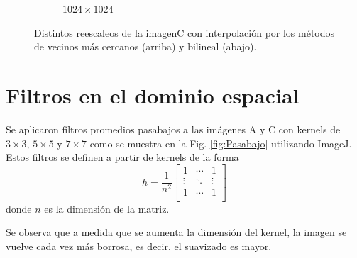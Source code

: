\documentclass[11pt,twocolumn,twoside]{opticajnl}
\begin{document}
\begin{figure}[h]
\begin{subfigure}[h]{0.24\linewidth}
            \caption{$1024\times1024$} 
         \end{subfigure}
    \caption{Distintos reescaleos de la imagenC con interpolación por los métodos de vecinos más cercanos (arriba) y bilineal (abajo).}
    \label{fig:Interpolate}
\end{figure}

\section{Filtros en el dominio espacial\label{sec:ej4}}

\vspace{0.3cm}

Se aplicaron filtros promedios pasabajos a las imágenes A y C con kernels de $3\times3$, $5\times5$ y $7\times7$ como se muestra en la Fig. \ref{fig:Pasabajo} utilizando ImageJ. Estos filtros se definen a partir de kernels de la forma 
\begin{equation}
    h = \frac{1}{n^2} 
    \begin{bmatrix}
    1 & \cdots & 1 \\
    \vdots & \ddots & \vdots \\
    1 & \cdots & 1 \\
    \end{bmatrix}
\end{equation}
donde $n$ es la dimensión de la matriz. 

Se observa que a medida que se aumenta la dimensión del kernel, la imagen se vuelve cada vez más borrosa, es decir, el suavizado es mayor.
\end{document}
